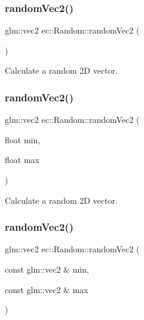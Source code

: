 \mbox{\label{classec_1_1_random_a6da9a117b49917951c77e09f25f20b4a}} 
\subsubsection{\texorpdfstring{random\+Vec2()}{randomVec2()}\hspace{0.1cm}{\footnotesize\ttfamily [1/3]}}
{\footnotesize\ttfamily glm\+::vec2 ec\+::\+Random\+::random\+Vec2 (\begin{DoxyParamCaption}{ }\end{DoxyParamCaption})\hspace{0.3cm}{\ttfamily [static]}}

Calculate a random 2D vector. \mbox{\label{classec_1_1_random_a0a8e82e0563c6358ad18dae596451a87}} 
\subsubsection{\texorpdfstring{random\+Vec2()}{randomVec2()}\hspace{0.1cm}{\footnotesize\ttfamily [2/3]}}
{\footnotesize\ttfamily glm\+::vec2 ec\+::\+Random\+::random\+Vec2 (\begin{DoxyParamCaption}\item[{float}]{min,  }\item[{float}]{max }\end{DoxyParamCaption})\hspace{0.3cm}{\ttfamily [static]}}

Calculate a random 2D vector. \mbox{\label{classec_1_1_random_aa32c562218dee5bc1d76135be4384a26}} 
\subsubsection{\texorpdfstring{random\+Vec2()}{randomVec2()}\hspace{0.1cm}{\footnotesize\ttfamily [3/3]}}
{\footnotesize\ttfamily glm\+::vec2 ec\+::\+Random\+::random\+Vec2 (\begin{DoxyParamCaption}\item[{const glm\+::vec2 \&}]{min,  }\item[{const glm\+::vec2 \&}]{max }\end{DoxyParamCaption})\hspace{0.3cm}{\ttfamily [static]}}

